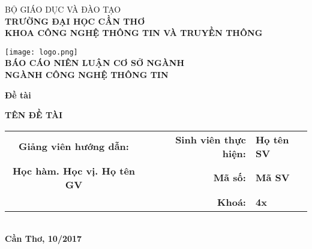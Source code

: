\documentclass[../thesis.tex]{subfiles}
\begin{document}
\begin{titlepage}

\begin{center}

BỘ GIÁO DỤC VÀ ĐÀO TẠO\\
\textbf{TRƯỜNG ĐẠI HỌC CẦN THƠ\\}
\textbf{KHOA CÔNG NGHỆ THÔNG TIN VÀ TRUYỀN THÔNG\\[1cm]}

\texttt{[image: logo.png]}\\[1cm]

\textbf{BÁO CÁO NIÊN LUẬN CƠ SỞ NGÀNH\\}
\textbf{NGÀNH CÔNG NGHỆ THÔNG TIN\\[2cm]}

\begin{large}
\textbf{Đề tài\\[0.5cm]}
\end{large}
\textbf{{\LARGE TÊN ĐỀ TÀI}}
\\[4cm]

\begin{tabular}{ c c r l }
 \textbf{Giảng viên hướng dẫn:} & & \textbf{Sinh viên thực hiện:} & \textbf{Họ tên SV}\\ 
 \textbf{Học hàm. Học vị. Họ tên GV} & & \textbf{Mã số:} & \textbf{Mã SV}\\  
 & & \textbf{Khoá:} & \textbf{4x}    
\end{tabular}
\\[4cm]

\textbf{Cần Thơ, 10/2017}

\end{center}

\end{titlepage}
\end{document}
